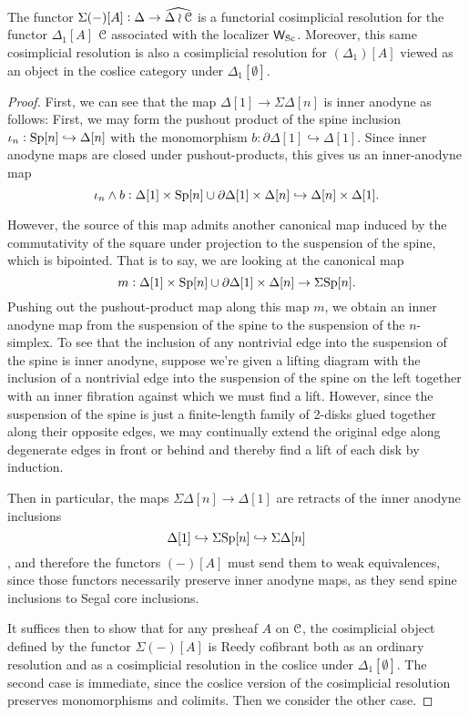 \begin{lemma}The functor \(\Sigma(-)[A]:\Delta \to \widehat{\Delta\wr\mathcal{C}}\) is a functorial cosimplicial resolution for the functor \(\Delta_1[A]\) \(\mathcal{C}\) associated with the localizer \(\mathsf{W}_{{\operatorname{Sc}}}\).  Moreover, this same cosimplicial resolution is also a cosimplicial resolution for \((\Delta_1)[A]\) viewed as an object in the coslice category under \(\Delta_1[\emptyset]\).
\end{lemma}
\begin{proof} First, we can see that the map \(\Delta[1]\to \Sigma\Delta[n]\) is inner anodyne as follows: First, we may form the pushout product of the spine inclusion \(\iota_n:{\operatorname{Sp}}[n]\hookrightarrow \Delta[n]\) with the monomorphism \(b:\partial\Delta[1]\hookrightarrow \Delta[1]\).  Since inner anodyne maps are closed under pushout-products, this gives us an inner-anodyne map \[\iota_n \wedge b: \Delta[1]\times {\operatorname{Sp}}[n] \cup \partial\Delta[1]\times \Delta[n]\hookrightarrow \Delta[n]\times \Delta[1].\]  

However, the source of this map admits another canonical map induced by the commutativity of the square under projection to the suspension of the spine, which is bipointed.  That is to say, we are looking at the canonical map \[m:\Delta[1]\times {\operatorname{Sp}}[n] \cup \partial\Delta[1]\times \Delta[n] \to \Sigma {\operatorname{Sp}}[n].\]  Pushing out the pushout-product map along this map \(m\), we obtain an inner anodyne map from the suspension of the spine to the suspension of the \(n\)-simplex.  To see that the inclusion of any nontrivial edge into the suspension of the spine is inner anodyne, suppose we're given a lifting diagram with the inclusion of a nontrivial edge into the suspension of the spine on the left together with an inner fibration against which we must find a lift. However, since the suspension of the spine is just a finite-length family of 2-disks glued together along their opposite edges, we may continually extend the original edge along degenerate edges in front or behind and thereby find a lift of each disk by induction.

Then in particular, the maps \(\Sigma\Delta[n]\to \Delta[1]\) are retracts of the inner anodyne inclusions \[\Delta[1]\hookrightarrow \Sigma{\operatorname{Sp}}[n]\hookrightarrow \Sigma \Delta[n]\],  and therefore the functors \((-)[A]\) must send them to weak equivalences, since those functors necessarily preserve inner anodyne maps, as they send spine inclusions to Segal core inclusions.   

It suffices then to show that for any presheaf \(A\) on \(\mathcal{C}\), the cosimplicial object defined by the functor \(\Sigma(-)[A]\) is Reedy cofibrant both as an ordinary resolution and as a cosimplicial resolution in the coslice under \(\Delta_1[\emptyset]\).  The second case is immediate, since the coslice version of the cosimplicial resolution preserves monomorphisms and colimits.  Then we consider the other case.


\end{proof}
